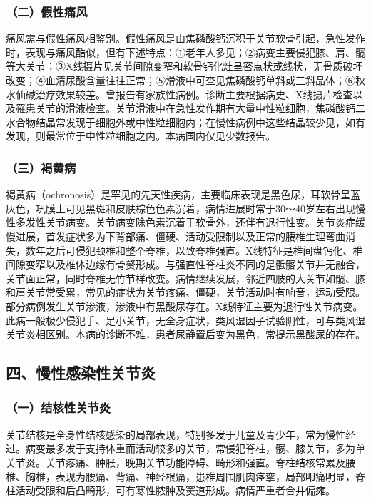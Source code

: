 \subsubsection{（二）假性痛风}

痛风需与假性痛风相鉴别。假性痛风是由焦磷酸钙沉积于关节软骨引起，急性发作时，表现与痛风酷似，但有下述特点：①老年人多见；②病变主要侵犯膝、肩、髋等大关节；③X线摄片见关节间隙变窄和软骨钙化灶呈密点状或线状，无骨质破坏改变；④血清尿酸含量往往正常；⑤滑液中可查见焦磷酸钙单斜或三斜晶体；⑥秋水仙碱治疗效果较差。曾报告有家族性病例。诊断主要根据病史、X线摄片检查以及罹患关节的滑液检查。关节滑液中在急性发作期有大量中性粒细胞，焦磷酸钙二水合物结晶常发现于细胞外或中性粒细胞内；在慢性病例中这些结晶较少见，如有发现，则最常位于中性粒细胞之内。本病国内仅见少数报告。

\subsubsection{（三）褐黄病}

褐黄病（ochronosis）是罕见的先天性疾病，主要临床表现是黑色尿，耳软骨呈蓝灰色，巩膜上可见黑斑和皮肤棕色色素沉着，病情进展时常于30～40岁左右出现慢性多发性关节病变。关节病变除色素沉着于软骨外，还伴有退行性变。关节炎症缓慢进展，首发症状多为下背部痛、僵硬、活动受限制以及正常的腰椎生理弯曲消失，数年之后可侵犯颈椎和整个脊椎，以致脊椎强直。X线特征是椎间盘钙化、椎间隙变窄以及椎体边缘有骨赘形成。与强直性脊柱炎不同的是骶髂关节并无融合，关节面正常，同时脊椎无竹节样改变。病情继续发展，邻近四肢的大关节如髋、膝和肩关节常受累，常见的症状为关节疼痛、僵硬，关节活动时有响音，运动受限。部分病例发生关节渗液，渗液中有黑酸尿存在。X线特征主要为退行性关节病变。此病一般极少侵犯手、足小关节，无全身症状，类风湿因子试验阴性，可与类风湿关节炎相区别。本病的诊断不难，患者尿静置后变为黑色，常提示黑酸尿的存在。

\subsection{四、慢性感染性关节炎}

\subsubsection{（一）结核性关节炎}

关节结核是全身性结核感染的局部表现，特别多发于儿童及青少年，常为慢性经过。病变最多发于支持体重而活动较多的关节，常侵犯脊柱，髋、膝关节，多为单关节炎。关节疼痛、肿胀，晚期关节功能障碍、畸形和强直。脊柱结核常累及腰椎、胸椎，表现为腰痛、背痛、神经根痛，患椎周围肌肉痉挛，局部叩痛明显，脊柱活动受限和后凸畸形，可有寒性脓肿及窦道形成。病情严重者合并偏瘫。

